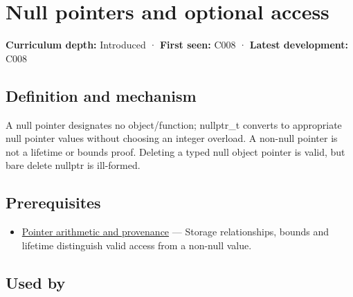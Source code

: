 \hypertarget{appendix-afae48c31800}{}\label{referencestart:appendix-afae48c31800}
\section{Null pointers and optional access}\label{appendix-afae48c31800-null-pointers-and-optional-access}

\hypertarget{appendix-afae48c31800-null-pointers-and-optional-access}{}

\textbf{Curriculum depth:} Introduced · \textbf{First seen:} C008 · \textbf{Latest development:} C008

\begin{allmightroledefinition}

\subsection{Definition and mechanism}\label{appendix-afae48c31800-definition-and-mechanism}

\hypertarget{appendix-afae48c31800-definition-and-mechanism}{}

A null pointer designates no object/function; nullptr\_t converts to appropriate null pointer values without choosing an integer overload. A non-null pointer is not a lifetime or bounds proof. Deleting a typed null object pointer is valid, but bare delete nullptr is ill-formed.

\end{allmightroledefinition}

\subsection{Prerequisites}\label{appendix-afae48c31800-prerequisites}

\hypertarget{appendix-afae48c31800-prerequisites}{}

\begin{itemize}
\tightlist
\item
  \hyperref[appendix-6af5921bc853]{Pointer arithmetic and provenance} --- Storage relationships, bounds and lifetime distinguish valid access from a non-null value.
\end{itemize}

\subsection{Used by}\label{appendix-afae48c31800-used-by}

\hypertarget{appendix-afae48c31800-used-by}{}

